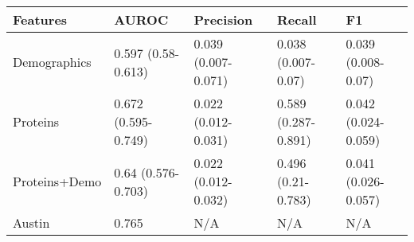 \begin{tabular}{lllll}
\toprule
Features & AUROC & Precision & Recall & F1 \\
\midrule
Demographics & 0.597 (0.58-0.613) & 0.039 (0.007-0.071) & 0.038 (0.007-0.07) & 0.039 (0.008-0.07) \\
Proteins & 0.672 (0.595-0.749) & 0.022 (0.012-0.031) & 0.589 (0.287-0.891) & 0.042 (0.024-0.059) \\
Proteins+Demo & 0.64 (0.576-0.703) & 0.022 (0.012-0.032) & 0.496 (0.21-0.783) & 0.041 (0.026-0.057) \\
Austin & 0.765 & N/A & N/A & N/A \\
\bottomrule
\end{tabular}
